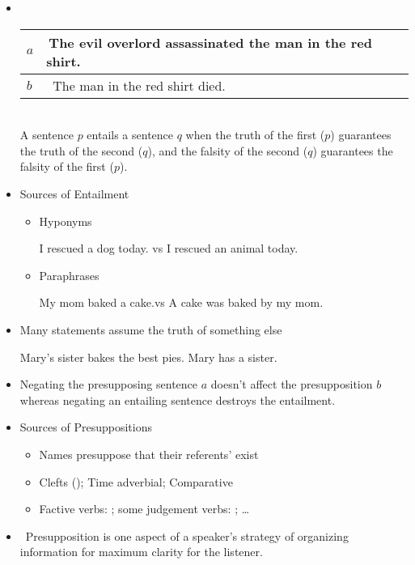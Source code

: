 \documentclass[headrule,footrule]{foils}
\begin{document}
\begin{itemize}
\item {} \\[2ex]
  \begin{tabular}{ll}
    $a$ & The evil overlord  assassinated the man in the red shirt. \\ \hline
    $b$ &  The man  in the red shirt died.
  \end{tabular}
  \\[2ex]
  A sentence $p$ entails a sentence $q$ when the truth of the first ($p$)
  guarantees the truth of the second ($q$), and the falsity of the
  second ($q$) guarantees the falsity of the first ($p$).
\item Sources of Entailment
\begin{itemize}
\item Hyponyms
  \begin{exe}
    \ix I rescued a dog today. \textnormal{vs} I rescued an animal today.
  \end{exe}
\item Paraphrases
  \begin{exe}
    \ix My mom baked a cake.\textnormal{vs}  A cake was baked by my mom.
  \end{exe}
\end{itemize}
\end{itemize}


\begin{itemize}
\item Many statements assume the truth of something else
  \begin{exe}
    \ex   \begin{xlist}
    \ix Mary's sister bakes the best pies. %
    \ix Mary has a sister. %
    \end{xlist}
  \end{exe}
\item Negating the presupposing sentence $a$ doesn't affect the presupposition $b$
 whereas negating an entailing sentence destroys the entailment.
\item Sources of Presuppositions
  \begin{itemize}
  \item Names presuppose that their referents' exist
  \item Clefts (); Time adverbial; Comparative
  \item Factive verbs: ; 
    some judgement verbs: ; \ldots
  \end{itemize}
\item  Presupposition is one aspect of a speaker’s strategy of
organizing information for maximum clarity for the listener.
\end{itemize}
\end{document}
